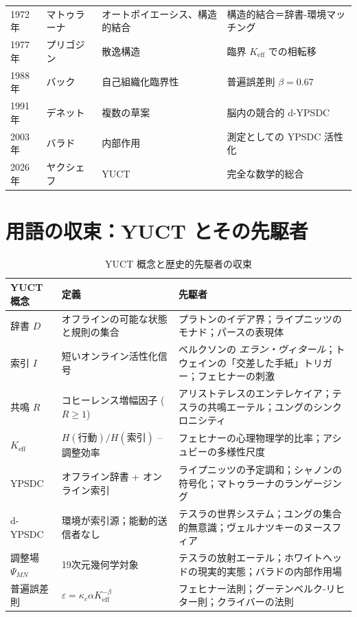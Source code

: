 \documentclass[12pt,a4paper]{article}
\begin{document}
\begin{table}[htbp]
\begin{tabular}{p{1.2cm}p{3cm}p{4.5cm}p{4cm}}
			1972年 & マトゥラーナ & オートポイエーシス、構造的結合 & 構造的結合＝辞書-環境マッチング \\
			1977年 & プリゴジン & 散逸構造 & 臨界 \(K_{\mathrm{eff}}\) での相転移 \\
			1988年 & バック & 自己組織化臨界性 & 普遍誤差則 \(\beta = 0.67\) \\
			1991年 & デネット & 複数の草案 & 脳内の競合的 d-YPSDC \\
			2003年 & バラド & 内部作用 & 測定としての YPSDC 活性化 \\
			2026年 & ヤクシェフ & YUCT & 完全な数学的総合 \\
			\bottomrule
		\end{tabular}
	\end{table}
	
	\section{用語の収束：YUCT とその先駆者}
	
	\begin{table}[htbp]
		\centering
		\caption{YUCT 概念と歴史的先駆者の収束}
		\label{tab:convergence}
		\small
		\begin{tabular}{p{2.5cm}p{4.5cm}p{4.5cm}}
			\toprule
			\textbf{YUCT 概念} & \textbf{定義} & \textbf{先駆者} \\
			\midrule
			辞書 \(D\) & オフラインの可能な状態と規則の集合 & プラトンのイデア界；ライプニッツのモナド；パースの表現体 \\
			索引 \(I\) & 短いオンライン活性化信号 & ベルクソンの \emph{エラン・ヴィタール}；トウェインの「交差した手紙」トリガー；フェヒナーの刺激 \\
			共鳴 \(R\) & コヒーレンス増幅因子 (\(R \ge 1\)) & アリストテレスのエンテレケイア；テスラの共鳴エーテル；ユングのシンクロニシティ \\
			\(K_{\mathrm{eff}}\) & \(H(\text{行動})/H(\text{索引})\) – 調整効率 & フェヒナーの心理物理学的比率；アシュビーの多様性尺度 \\
			YPSDC & オフライン辞書 + オンライン索引 & ライプニッツの予定調和；シャノンの符号化；マトゥラーナのランゲージング \\
			d-YPSDC & 環境が索引源；能動的送信者なし & テスラの世界システム；ユングの集合的無意識；ヴェルナツキーのヌースフィア \\
			調整場 \(\Psi_{MN}\) & 19次元幾何学対象 & テスラの放射エーテル；ホワイトヘッドの現実的実態；バラドの内部作用場 \\
			普遍誤差則 & \(\varepsilon = \kappa_c \alpha K_{\mathrm{eff}}^{-\beta}\) & フェヒナー法則；グーテンベルク-リヒター則；クライバーの法則 \\
			\bottomrule
		\end{tabular}
	\end{table}
	
\end{document}

